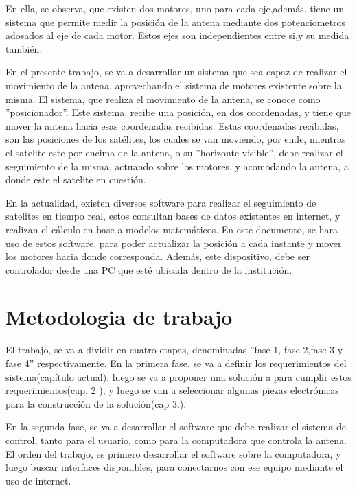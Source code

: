 En ella, se observa, que existen dos motores, uno para cada eje,además, tiene un sistema que permite medir la posición de la antena mediante dos potenciometros adosados al eje de cada motor. Estos ejes son independientes entre si,y su medida también. 



En el presente trabajo, se va a desarrollar un sistema que sea capaz de realizar el movimiento de la antena, aprovechando el sistema de motores existente sobre la misma. El sistema, que realiza el movimiento de la antena, se conoce como ''posicionador''. Este sistema, recibe una posición, en dos coordenadas, y tiene que mover la antena hacia esas coordenadas recibidas. Estas coordenadas recibidas, son las posiciones de los satélites, los cuales se van moviendo, por ende, mientras el satelite este por encima de la antena, o su ''horizonte visible'', debe realizar el seguimiento de la misma, actuando sobre los motores, y acomodando la antena, a donde este el satelite en cuestión.

En la actualidad, existen diversos software para realizar el seguimiento de satelites en tiempo real, estos consultan bases de datos existentes en internet, y realizan el cálculo en base a modelos matemáticos. En este documento, se hara uso de estos software, para poder actualizar la posición a cada instante y mover los motores hacia donde corresponda. Además, este dispositivo, debe ser controlador desde una PC que esté ubicada dentro de la institución. 

\section{Metodologia de trabajo}

El trabajo, se va a dividir en cuatro etapas, denominadas ''fase 1, fase 2,fase 3 y fase 4'' respectivamente. En la primera fase, se va a definir los requerimientos del sistema(capítulo actual), luego se va a proponer una solución a para cumplir estos requerimientos(cap. 2 ), y luego se van a seleccionar algunas piezas electrónicas para la construcción de la solución(cap 3.). 

En la segunda fase, se va a desarrollar el software que debe realizar el sistema de control, tanto para el usuario, como para la computadora que controla la antena. El orden del trabajo, es primero desarrollar el software sobre la computadora, y luego buscar interfaces disponibles, para conectarnos con ese equipo mediante el uso de internet. 



